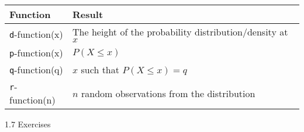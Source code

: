 \documentclass[]{book}
\begin{document}
\begin{longtable}[]{@{}ll@{}}
\toprule
\begin{minipage}[b]{0.24\columnwidth}\raggedright\strut
Function\strut
\end{minipage} & \begin{minipage}[b]{0.70\columnwidth}\raggedright\strut
Result\strut
\end{minipage}\tabularnewline
\midrule
\endhead
\begin{minipage}[t]{0.24\columnwidth}\raggedright\strut
\texttt{d}-function(x)\strut
\end{minipage} & \begin{minipage}[t]{0.70\columnwidth}\raggedright\strut
The height of the probability distribution/density at \(x\)\strut
\end{minipage}\tabularnewline
\begin{minipage}[t]{0.24\columnwidth}\raggedright\strut
\texttt{p}-function(x)\strut
\end{minipage} & \begin{minipage}[t]{0.70\columnwidth}\raggedright\strut
\(P\left(X\le x\right)\)\strut
\end{minipage}\tabularnewline
\begin{minipage}[t]{0.24\columnwidth}\raggedright\strut
\texttt{q}-function(q)\strut
\end{minipage} & \begin{minipage}[t]{0.70\columnwidth}\raggedright\strut
\(x\) such that \(P\left(X\le x\right) = q\)\strut
\end{minipage}\tabularnewline
\begin{minipage}[t]{0.24\columnwidth}\raggedright\strut
\texttt{r}-function(n)\strut
\end{minipage} & \begin{minipage}[t]{0.70\columnwidth}\raggedright\strut
\(n\) random observations from the distribution\strut
\end{minipage}\tabularnewline
\bottomrule
\end{longtable}

1.7 Exercises
\end{document}
